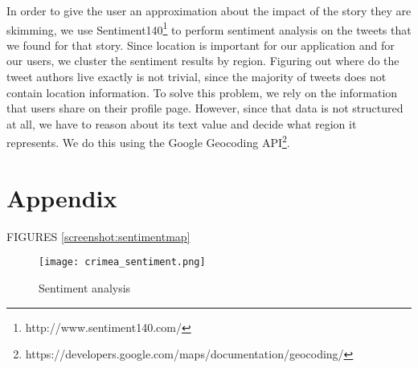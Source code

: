 \documentclass{acm_proc_10ptArticle-sp}
\begin{document}
In order to give the user an approximation about the impact of the story they are skimming, we use Sentiment140\footnote{http://www.sentiment140.com/} to perform sentiment analysis on the tweets that we found for that story. Since location is important for our application and for our users, we cluster the sentiment results by region. Figuring out where do the tweet authors live exactly is not trivial, since the majority of tweets does not contain location information. To solve this problem, we rely on the information that users share on their profile page. However, since that data is not structured at all, we have to reason about its text value and decide what region it represents. We do this using the Google Geocoding API\footnote{https://developers.google.com/maps/documentation/geocoding/}. 





\newpage

\onecolumn
\section{Appendix}





FIGURES
\ref{screenshot:sentimentmap}
\begin{figure}[H]
	\centering
	\texttt{[image: crimea\_sentiment.png]}
	\caption{Sentiment analysis}
	\label{fig:sentimentmap}
\end{figure}
\end{document}
